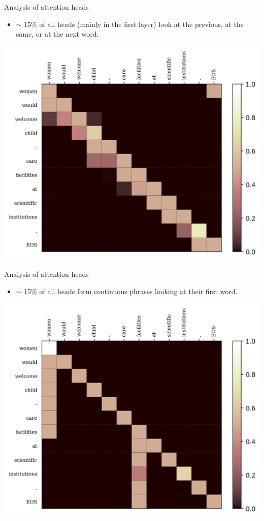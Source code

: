 \documentclass{beamer}
\begin{document}
\begin{frame}{Analysis of attention heads}
    \begin{itemize}
         \item $\sim$ 15\% of all heads (mainly in the first layer) look at the previous, at the same, or at the next word.
    \end{itemize}
    \begin{center}
        \includegraphics[scale=0.5]{look_at_previous.png}
    \end{center}
\end{frame}

\begin{frame}{Analysis of attention heads}
    \begin{itemize}
         \item $\sim$ 15\% of all heads form continuous phrases looking at their first word.
    \end{itemize}
    \begin{center}
        \includegraphics[scale=0.5]{look_at_first.png}
    \end{center}
\end{frame}
\end{document}
